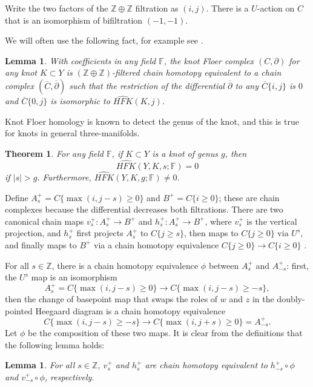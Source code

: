 \documentclass{article}
\newtheorem{theorem}[equation]{Theorem}
\newtheorem{lemma}[equation]{Lemma}
\theoremstyle{remark}
\numberwithin{equation}{section}
\numberwithin{table}{section}
\newcommand{\wh}{\widehat}
\renewcommand{\(}{\left(}
\renewcommand{\)}{\right)}
\newcommand{\Z}{{\mathbb{Z}}}
\newcommand{\F}{{\mathbb{F}}}
\begin{document}
Write the two factors of the $\Z\oplus\Z$ filtration as $(i,j)$. There is a $U$-action on $C$ that is an isomorphism of bifiltration $(-1,-1)$.

We will often use the following fact, for example see \cite[Reduction Lemma]{hedden-watson-geo-botony}.

\begin{lemma}\label{lem:reduction}
With coefficients in any field $\F$, the knot Floer complex $(C,\partial)$ for any knot $K\subset Y$ is $(\Z\oplus\Z)$-filtered chain homotopy equivalent to a chain complex $(\overline C,\overline\partial)$ such that the restriction of the differential $\overline\partial$ to any $\overline C\{i,j\}$ is $0$ and $\overline C\{0,j\}$ is isomorphic to $\wh{HFK}(K,j)$.
\end{lemma}

Knot Floer homology is known to detect the genus of the knot, and this is true for knots in general three-manifolds.

\begin{theorem}\cite[Theorem 2.4]{ni-thurston-norm-cosmetic}\label{thm:hfk-detects-genus}
For any field $\F$, if $K\subset Y$ is a knot of genus $g$, then $$\wh{HFK}(Y,K,s;\F)=0$$ if $|s|>g$. Furthermore, $\wh{HFK}(Y,K,g;\F)\ne 0$.
\end{theorem}

Define $A_s^+=C\{\max(i,j-s)\ge 0\}$ and $B^+=C\{i\ge 0\}$; these are chain complexes because the differential decreases both filtrations. There are two canonical chain maps $v_s^+:A_s^+\to B^+$ and $h_s^+:A_s^+\to B^+$, where $v_s^+$ is the vertical projection, and $h_s^+$ first projects $A_s^+$ to $C\{j\ge s\}$, then maps to $C\{j\ge 0\}$ via $U^s$, and finally maps to $B^+$ via a chain homotopy equivalence $C\{j\ge 0\}\to C\{i\ge 0\}$ \cite{oz-sz-integer}.

For all $s\in\Z$, there is a chain homotopy equivalence $\phi$ between $A_s^+$ and $A_{-s}^+$: first, the $U^s$ map is an isomorphism
$$A_s^+=C\{\max(i,j-s)\ge0\}\to C\{\max(i,j-s)\ge-s\}, $$ then the change of basepoint map that swaps the roles of $w$ and $z$ in the doubly-pointed Heegaard diagram is a chain homotopy equivalence
$$C\{\max(i,j-s)\ge-s\}\to C\{\max(i,j+s)\ge0\}=A_{-s}^+.$$ Let $\phi$ be the composition of these two maps. It is clear from the definitions that the following lemma holds: 

\begin{lemma}\label{lem:v-h-equiv}
For all $s\in\Z$, $v_s^+$ and $h_s^+$ are chain homotopy equivalent to $h_{-s}^+\circ\phi$ and $v_{-s}^+\circ\phi$, respectively.
\end{lemma}
\end{document}
